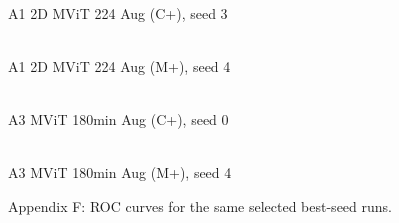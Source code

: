 \begin{figure}[p]
\centering
\begin{minipage}{0.48\textwidth}
\centering
{}
\\[-1mm]\scriptsize A1 2D MViT 224 Aug (C+), seed 3
\end{minipage}\hfill
\begin{minipage}{0.48\textwidth}
\centering
{}
\\[-1mm]\scriptsize A1 2D MViT 224 Aug (M+), seed 4
\end{minipage}
\vspace{2mm}
\begin{minipage}{0.48\textwidth}
\centering
{}
\\[-1mm]\scriptsize A3 MViT 180min Aug (C+), seed 0
\end{minipage}\hfill
\begin{minipage}{0.48\textwidth}
\centering
{}
\\[-1mm]\scriptsize A3 MViT 180min Aug (M+), seed 4
\end{minipage}
\caption{Appendix F: ROC curves for the same selected best-seed runs.}
\label{fig:appF_roc_grid}
\end{figure}
